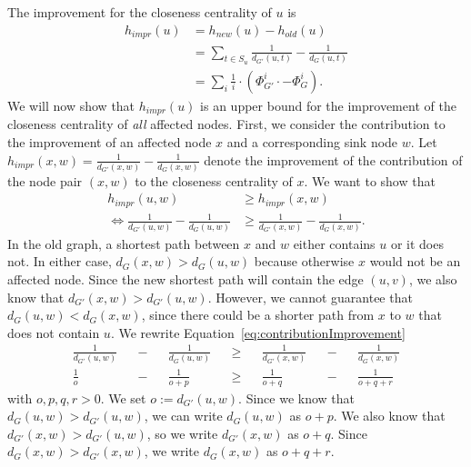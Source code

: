 The improvement for the closeness centrality of $u$ is 
\begin{align}
	h_{impr}(u) &= h_{new}(u) - h_{old}(u) \nonumber \\
	            &= \sum_{t \in S_u}{\frac{1}{d_{G'}(u, t)} - \frac{1}{d_G(u, t)}} \nonumber \\
	            &= \sum_{i}{\frac{1}{i} \cdot \left(\Phi_{G'}^i \cdot - \Phi_G^i\right)} \label{eq:levelImprovementBound}.
\end{align}
We will now show that $h_{impr}(u)$ is an upper bound for the improvement of the closeness centrality of \emph{all} affected nodes. First, we consider the contribution to the improvement of an affected node $x$ and a corresponding sink node $w$. Let $h_{impr}(x, w) = \frac{1}{d_{G'}(x, w)} - \frac{1}{d_{G}(x, w)} $ denote the improvement of the contribution of the node pair $(x, w)$ to the closeness centrality of $x$. We want to show that 
\begin{align}
	h_{impr}(u, w) &\geq h_{impr}(x, w) \nonumber \\
	\iff \frac{1}{d_{G'}(u, w)} - \frac{1}{d_{G}(u, w)} &\geq \frac{1}{d_{G'}(x, w)} - \frac{1}{d_{G}(x, w)} \label{eq:contributionImprovement}.
\end{align}
In the old graph, a shortest path between $x$ and $w$ either contains $u$ or it does not. In either case, $d_G(x, w) > d_G(u, w)$ because otherwise $x$ would not be an affected node. Since the new shortest path will contain the edge $(u, v)$, we also know that $d_{G'}(x, w) > d_{G'}(u, w)$. However, we cannot guarantee that $d_G(u, w) < d_G(x, w)$, since there could be a shorter path from $x$ to $w$ that does not contain $u$. We rewrite Equation~\ref{eq:contributionImprovement}
\begin{align}
    \frac{1}{d_{G'}(u, w)} &&-&& \frac{1}{d_{G}(u, w)} &&\geq && \frac{1}{d_{G'}(x, w)} &&-&& \frac{1}{d_{G}(x, w)} \nonumber \\ 
	\frac{1}{o} &&-&& \frac{1}{o + p} &&\geq && \frac{1}{o + q} &&-&& \frac{1}{o + q + r} \label{eq:contributionImprovementRewritten}
\end{align}
with $o, p, q, r > 0$. We set $o := d_{G'}(u, w)$. Since we know that $d_G(u, w) > d_{G'}(u, w)$, we can write $d_G(u, w)$ as $o + p$. We also know that $d_{G'}(x, w) > d_{G'}(u, w)$, so we write $d_{G'}(x, w)$ as $o + q$. Since $d_{G}(x, w) > d_{G'}(x, w)$, we write $d_G(x, w)$ as $o + q + r$.

